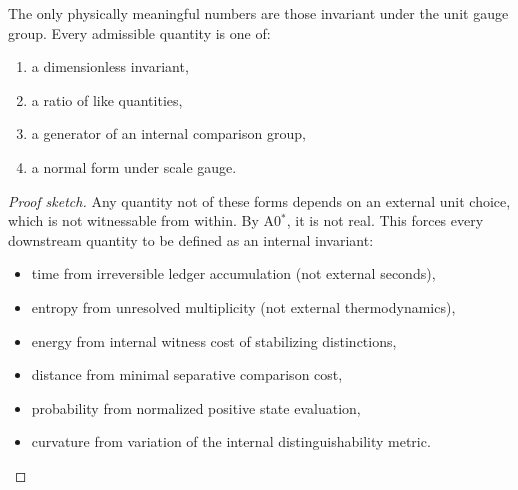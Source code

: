 \begin{theorem}
\label{thm:canonical-quantities}
The only physically meaningful numbers are those invariant under the unit
gauge group.  Every admissible quantity is one of:
\begin{enumerate}[nosep, label=(\arabic*)]
  \item a dimensionless invariant,
  \item a ratio of like quantities,
  \item a generator of an internal comparison group,
  \item a normal form under scale gauge.
\end{enumerate}
\begin{proof}[Proof sketch]
Any quantity not of these forms depends on an external unit choice, which
is not witnessable from within.  By A0$^*$, it is not real.  This forces
every downstream quantity to be defined as an internal invariant:
\begin{itemize}[nosep]
  \item time from irreversible ledger accumulation (not external seconds),
  \item entropy from unresolved multiplicity (not external thermodynamics),
  \item energy from internal witness cost of stabilizing distinctions,
  \item distance from minimal separative comparison cost,
  \item probability from normalized positive state evaluation,
  \item curvature from variation of the internal distinguishability metric.
\end{itemize}
\end{proof}
\end{theorem}

